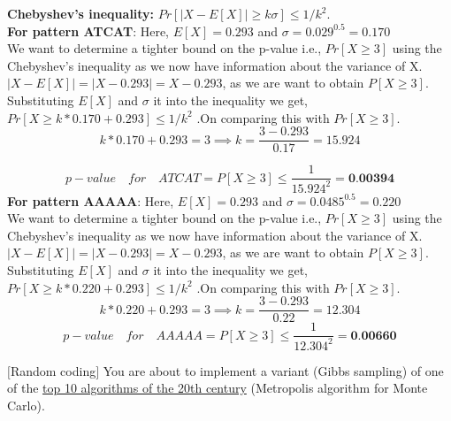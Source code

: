 \documentclass[solution,addpoints,12pt]{exam}
\begin{document}
\begin{questions}
\begin{parts}
\begin{solution}
\textbf{Chebyshev's inequality:} $Pr[|X-E[X]| \ge k\sigma] \le 1/k^2$. \\
\textbf{For pattern ATCAT}: Here, $E[X] = 0.293$ and $\sigma = 0.029^{0.5} = 0.170$\\
We want to determine a tighter bound on the p-value i.e., $Pr[X\ge3]$ using the Chebyshev's inequality as we now have information about the variance of X.
\vspace{3mm}
$|X-E[X]| = |X-0.293| = X-0.293$, as we are want to obtain $P[X\ge3]$. Substituting $E[X]$ and $\sigma$ it into the inequality we get,\vspace{2mm}\\
$Pr[X\ge k*0.170 + 0.293] \le 1/k^2$ .On comparing this with $Pr[X\ge3]$.
 $$k*0.170 + 0.293 = 3 \implies k = \dfrac{3-0.293}{0.17} = 15.924$$

$$p-value\quad for\quad ATCAT= P[X\ge3]\le \dfrac{1}{15.924^2} = \textbf{0.00394}$$
\textbf{For pattern AAAAA}: Here, $E[X] = 0.293$ and $\sigma = 0.0485^{0.5} = 0.220$\\
We want to determine a tighter bound on the p-value i.e., $Pr[X\ge3]$ using the Chebyshev's inequality as we now have information about the variance of X.
\vspace{3mm}
$|X-E[X]| = |X-0.293| = X-0.293$, as we are want to obtain $P[X\ge3]$. Substituting $E[X]$ and $\sigma $ it into the inequality we get,\vspace{2mm}\\
$Pr[X\ge k*0.220 + 0.293] \le 1/k^2$ .On comparing this with $Pr[X\ge3]$.
 $$k*0.220 + 0.293 = 3 \implies k = \dfrac{3-0.293}{0.22} = 12.304$$
$$p-value\quad for\quad AAAAA= P[X\ge3]\le \dfrac{1}{12.304^2} = \textbf{0.00660}$$

\end{solution}
\end{parts} 


\question[10] $[$Random coding$]$
You are about to implement a variant (Gibbs sampling) of one of the \href{https://doi.ieeecomputersociety.org/10.1109/MCISE.2000.814652}{top 10 algorithms of the 20th century} (Metropolis algorithm for Monte Carlo).  
\begin{parts}

\end{parts}
\end{questions}
\end{document}
